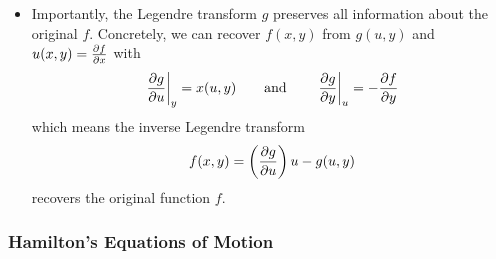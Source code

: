 \documentclass[11pt, a4paper]{article}
\newcommand{\eqtext}[1]{\qquad \text{#1} \qquad}
\begin{document}
\begin{itemize}
	\item Importantly, the Legendre transform $ g $ preserves all information about the original $ f $. Concretely, we can recover $ f(x, y) $ from $ g(u, y) $ and $ u(x, y) = \pdv{f}{x} $ with
	\begin{equation*}
		\eval{\pdv{g}{u}}_{y} = x(u, y) \eqtext{and} 	\eval{\pdv{g}{y}}_{u} = - \pdv{f}{y}
	\end{equation*}
	which means the inverse Legendre transform
	\begin{equation*}
		f(x, y) = \left(\pdv{g}{u}\right) u - g(u, y)
	\end{equation*}
	recovers the original function $ f $.
\end{itemize}

\subsubsection{Hamilton's Equations of Motion}
\end{document}

